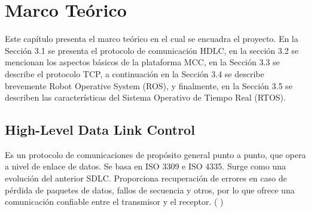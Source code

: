 \documentclass[withindex,glossary]{cam-thesis}
\begin{document}
\chapter{Marco Teórico}
Este capítulo presenta el marco teórico en el cual se encuadra el proyecto. En la Sección 3.1 se presenta el protocolo de comunicación HDLC, en la sección 3.2 se mencionan los aspectos básicos de la plataforma MCC, en la Sección 3.3 se describe el protocolo TCP, a continuación en la Sección 3.4 se describe brevemente Robot Operative System (ROS), y finalmente, en la Sección 3.5 se describen las características del Sistema Operativo de Tiempo Real (RTOS).

\section{High-Level Data Link Control}
Es un protocolo de comunicaciones de propósito general punto a punto, que opera a nivel de enlace de datos. Se basa en ISO 3309 e ISO 4335. Surge como una evolución del anterior SDLC. Proporciona recuperación de errores en caso de pérdida de paquetes de datos, fallos de secuencia y otros, por lo que ofrece una comunicación confiable entre el transmisor y el receptor. (\cite{RFC2687} \cite{RFC1662})
\end{document}
